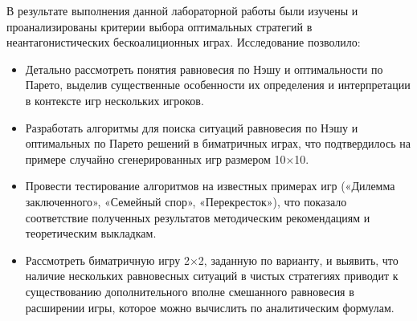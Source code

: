 \conclusion

В результате выполнения данной лабораторной работы были изучены и проанализированы
критерии выбора оптимальных стратегий в неантагонистических бескоалиционных играх.
Исследование позволило:

\begin{itemize}
    \item Детально рассмотреть понятия равновесия по Нэшу и оптимальности по Парето,
          выделив существенные особенности их определения и интерпретации в контексте
          игр нескольких игроков.
    \item Разработать алгоритмы для поиска ситуаций равновесия по Нэшу и оптимальных по
          Парето решений в биматричных играх, что подтвердилось на примере случайно
          сгенерированных игр размером 10×10.
    \item Провести тестирование алгоритмов на известных примерах игр («Дилемма
          заключенного», «Семейный спор», «Перекресток»), что показало соответствие
          полученных результатов методическим рекомендациям и теоретическим выкладкам.
    \item Рассмотреть биматричную игру 2×2, заданную по варианту, и выявить, что наличие
          нескольких равновесных ситуаций в чистых стратегиях приводит к существованию
          дополнительного вполне смешанного равновесия в расширении игры, которое можно
          вычислить по аналитическим формулам.
\end{itemize}

